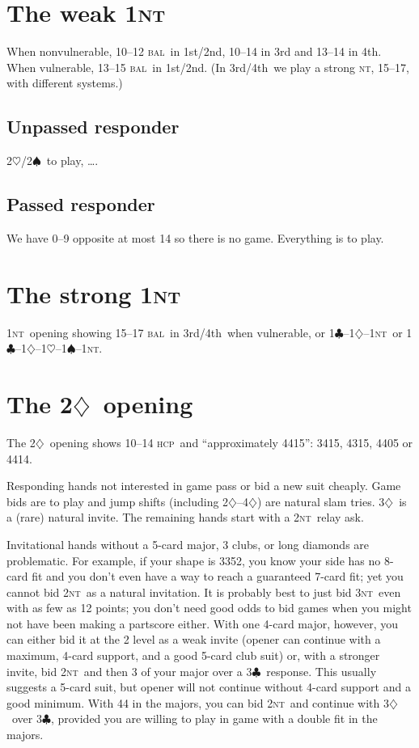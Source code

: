 \documentclass{report}
\newcommand{\fs}{1st/2nd}
\newcommand{\tf}{3rd/4th}
\newcommand{\hcp}{\textsc{hcp}}
\newcommand{\bal}{\textsc{bal}}
\renewcommand{\c}{\ensuremath{\clubsuit}}
\renewcommand{\d}{\ensuremath{\diamondsuit}}
\newcommand{\h}{\ensuremath{\heartsuit}}
\newcommand{\s}{\ensuremath{\spadesuit}}
\newcommand{\nt}{\textsc{nt}}
\newcommand{\+}{\ensuremath{^+}}
\begin{document}
\chapter{The weak 1\nt}

When nonvulnerable, 10--12 \bal\ in \fs, 10--14 in 3rd and 13--14 in
4th.  When vulnerable, 13--15 \bal\ in \fs.  (In \tf\ we play a strong
\nt, 15--17, with different systems.)

\section{Unpassed responder}
2\h/2\s\ to play, \dots.

\section{Passed responder}
We have 0--9 opposite at most 14 so there is no game.  Everything is
to play.

\chapter{The strong 1\nt}
1\nt\ opening showing 15--17 \bal\ in \tf\ when vulnerable, or
1\c--1\d--1\nt\ or 1\c--1\d--1\h--1\s--1\nt.

\chapter{The 2\d\ opening}

The 2\d\ opening shows 10--14 \hcp\ and ``approximately 4415'': 3415,
4315, 4405 or 4414.

Responding hands not interested in game pass or bid a new suit
cheaply.  Game bids are to play and jump shifts (including 2\d--4\d)
are natural slam tries.  3\d\ is a (rare) natural invite.  The
remaining hands start with a 2\nt\ relay ask.

Invitational hands without a 5-card major, 3 clubs, or long diamonds
are problematic.  For example, if your shape is 3352, you know your
side has no 8-card fit and you don't even have a way to reach a
guaranteed 7-card fit; yet you cannot bid 2\nt\ as a natural
invitation.  It is probably best to just bid 3\nt\ even with as few as
12 points; you don't need good odds to bid games when you might not
have been making a partscore either.  With one 4-card major, however,
you can either bid it at the 2 level as a weak invite (opener can
continue with a maximum, 4-card support, and a good 5-card club suit)
or, with a stronger invite, bid 2\nt\ and then 3 of your major over a
3\c\ response.  This usually suggests a 5-card suit, but opener will
not continue without 4-card support and a good minimum.  With 44 in
the majors, you can bid 2\nt\ and continue with 3\d\ over 3\c,
provided you are willing to play in game with a double fit in the
majors.
\end{document}
